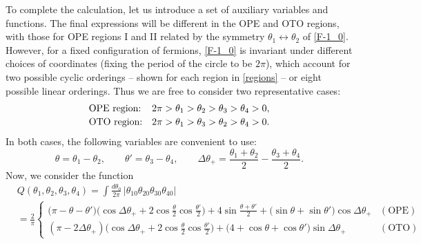 \documentclass[12pt]{article}
\newcommand{\const}{\mathrm{const}}
\newcommand{\tht}{\theta}
\newcommand{\De}{\Delta}
\begin{document}
To complete the calculation, let us introduce a set of auxiliary variables and functions. The final expressions will be different in the OPE and OTO regions,
with those for OPE regions I and II related by the symmetry $\tht_1 \leftrightarrow \tht_2$ of \eqref{F-1_0}. However, for a fixed configuration of fermions, \eqref{F-1_0} is invariant under different choices of coordinates (fixing the period of the circle to be $2\pi$), which account for two possible cyclic orderings -- shown for each region in \eqref{regions} -- or eight possible linear orderings. Thus we are free to consider two representative cases:
\begin{equation} \label{repcases}
\begin{array}{@{}l@{\quad}l@{}}
\text{OPE region:} & 2\pi>\theta_1>\theta_2>\theta_3>\theta_4>0,\vspace{2pt}\\
\text{OTO region:} & 2\pi>\theta_1>\theta_3>\theta_2>\theta_4>0.
\end{array}
\end{equation}
In both cases, the following variables are convenient to use:
\begin{equation}
\tht=\theta_1-\theta_2,\qquad \tht'=\theta_3-\theta_4,\qquad
\De \tht_+=\frac{\theta_1+\theta_2}{2}-\frac{\theta_3+\theta_4}{2}.
\end{equation}
Now, we consider the function
\begin{equation}
\begin{aligned}
&Q(\theta_1,\theta_2,\theta_3,\theta_4)
=\int\frac{d\theta_0}{2\pi}\,|\theta_{10}\theta_{20}\theta_{30}\theta_{40}|
\\[3pt]
&=\frac{2}{\pi}\begin{cases}
\bigl(\pi-\tht-\tht'\bigr)\bigl(\cos \De \tht_++2\cos\frac{\tht}{2}\cos\frac{\tht'}{2}\bigr)
+4\sin\frac{\tht+\tht'}{2}+\bigl(\sin \tht+\sin \tht'\bigr)\cos \De \tht_+
&(\text{OPE})\\[3pt]
(\pi-2\De \tht_+)\bigl(\cos \De \tht_++2\cos\frac{\tht}{2}\cos\frac{\tht'}{2}\bigr)
+\bigl(4+\cos \tht+\cos \tht'\bigr)\sin \De \tht_+
&(\text{OTO})
\end{cases}
\end{aligned}
\end{equation}
\end{document}
